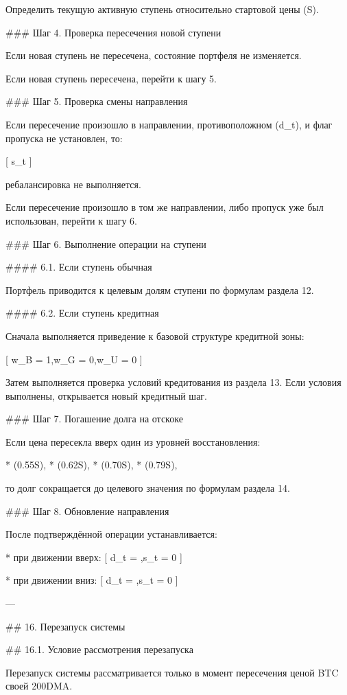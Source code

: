 Определить текущую активную ступень относительно стартовой цены (S).

### Шаг 4. Проверка пересечения новой ступени

Если новая ступень не пересечена, состояние портфеля не изменяется.

Если новая ступень пересечена, перейти к шагу 5.

### Шаг 5. Проверка смены направления

Если пересечение произошло в направлении, противоположном (d_t), и флаг пропуска не установлен, то:

[
s_t 
]

ребалансировка не выполняется.

Если пересечение произошло в том же направлении, либо пропуск уже был использован, перейти к шагу 6.

### Шаг 6. Выполнение операции на ступени

#### 6.1. Если ступень обычная

Портфель приводится к целевым долям ступени по формулам раздела 12.

#### 6.2. Если ступень кредитная

Сначала выполняется приведение к базовой структуре кредитной зоны:

[
w_B = 1,\qquad w_G = 0,\qquad w_U = 0
]

Затем выполняется проверка условий кредитования из раздела 13.
Если условия выполнены, открывается новый кредитный шаг.

### Шаг 7. Погашение долга на отскоке

Если цена пересекла вверх один из уровней восстановления:

* (0.55S),
* (0.62S),
* (0.70S),
* (0.79S),

то долг сокращается до целевого значения по формулам раздела 14.

### Шаг 8. Обновление направления

После подтверждённой операции устанавливается:

* при движении вверх:
  [
  d_t = \uparrow,\qquad s_t = 0
  ]

* при движении вниз:
  [
  d_t = \downarrow,\qquad s_t = 0
  ]

---

## 16. Перезапуск системы

## 16.1. Условие рассмотрения перезапуска

Перезапуск системы рассматривается только в момент пересечения ценой BTC своей 200DMA.

